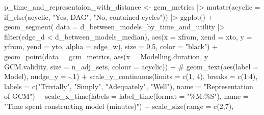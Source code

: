 \documentclass[
  letterpaper,
  DIV=11,
  numbers=noendperiod]{scrartcl}
\newenvironment{Shaded}{\begin{snugshade}}{\end{snugshade}}
\newcommand{\AttributeTok}[1]{\textcolor[rgb]{0.40,0.45,0.13}{#1}}
\newcommand{\CommentTok}[1]{\textcolor[rgb]{0.37,0.37,0.37}{#1}}
\newcommand{\DecValTok}[1]{\textcolor[rgb]{0.68,0.00,0.00}{#1}}
\newcommand{\FloatTok}[1]{\textcolor[rgb]{0.68,0.00,0.00}{#1}}
\newcommand{\FunctionTok}[1]{\textcolor[rgb]{0.28,0.35,0.67}{#1}}
\newcommand{\NormalTok}[1]{\textcolor[rgb]{0.00,0.23,0.31}{#1}}
\newcommand{\OtherTok}[1]{\textcolor[rgb]{0.00,0.23,0.31}{#1}}
\newcommand{\SpecialCharTok}[1]{\textcolor[rgb]{0.37,0.37,0.37}{#1}}
\newcommand{\StringTok}[1]{\textcolor[rgb]{0.13,0.47,0.30}{#1}}
\begin{document}
\begin{Shaded}
\begin{Highlighting}[]
\NormalTok{p\_time\_and\_representaion\_with\_distance }\OtherTok{\textless{}{-}} 
\NormalTok{    gcm\_metrics }\SpecialCharTok{|\textgreater{}} 
    \FunctionTok{mutate}\NormalTok{(}\AttributeTok{acyclic =} \FunctionTok{if\_else}\NormalTok{(acyclic, }\StringTok{"Yes, DAG"}\NormalTok{, }\StringTok{"No, contained cycles"}\NormalTok{)) }\SpecialCharTok{|\textgreater{}} 
    \FunctionTok{ggplot}\NormalTok{() }\SpecialCharTok{+}
    \FunctionTok{geom\_segment}\NormalTok{(}
        \AttributeTok{data =}\NormalTok{ d\_between\_models\_by\_time\_and\_utility }\SpecialCharTok{|\textgreater{}} 
            \FunctionTok{filter}\NormalTok{(edge\_d }\SpecialCharTok{\textless{}}\NormalTok{ d\_between\_models\_median),}
        \FunctionTok{aes}\NormalTok{(}\AttributeTok{x =}\NormalTok{ xfrom, }\AttributeTok{xend =}\NormalTok{ xto, }\AttributeTok{y =}\NormalTok{ yfrom, }\AttributeTok{yend =}\NormalTok{ yto,}
            \AttributeTok{alpha =}\NormalTok{ edge\_w), }\AttributeTok{size =} \FloatTok{0.5}\NormalTok{, }\AttributeTok{color =} \StringTok{"black"}\NormalTok{) }\SpecialCharTok{+}
    \FunctionTok{geom\_point}\NormalTok{(}\AttributeTok{data =}\NormalTok{ gcm\_metrics, }
               \FunctionTok{aes}\NormalTok{(}\AttributeTok{x =}\NormalTok{ Modelling.duration, }\AttributeTok{y =}\NormalTok{ GCM.validity, }\AttributeTok{size =}\NormalTok{ n\_adj\_sets, }\AttributeTok{colour =}\NormalTok{ acyclic)) }\SpecialCharTok{+}
    \CommentTok{\# geom\_text(aes(label = Model), nudge\_y = {-}.1) +}
    \FunctionTok{scale\_y\_continuous}\NormalTok{(}\AttributeTok{limits =} \FunctionTok{c}\NormalTok{(}\DecValTok{1}\NormalTok{, }\DecValTok{4}\NormalTok{),}
                       \AttributeTok{breaks =} \FunctionTok{c}\NormalTok{(}\DecValTok{1}\SpecialCharTok{:}\DecValTok{4}\NormalTok{),}
                       \AttributeTok{labels =} \FunctionTok{c}\NormalTok{(}\StringTok{"Trivially"}\NormalTok{, }\StringTok{"Simply"}\NormalTok{, }\StringTok{"Adequately"}\NormalTok{, }\StringTok{"Well"}\NormalTok{),}
                       \AttributeTok{name =} \StringTok{"Representation of GCM"}\NormalTok{) }\SpecialCharTok{+}
     \FunctionTok{scale\_x\_time}\NormalTok{(}\AttributeTok{labels =} \FunctionTok{label\_time}\NormalTok{(}\AttributeTok{format =} \StringTok{"\%M:\%S"}\NormalTok{),}
                  \AttributeTok{name =} \StringTok{"Time spent constructing model (minutes)"}\NormalTok{) }\SpecialCharTok{+}
    \FunctionTok{scale\_size}\NormalTok{(}\AttributeTok{range =} \FunctionTok{c}\NormalTok{(}\DecValTok{2}\NormalTok{,}\DecValTok{7}\NormalTok{),}

\end{Highlighting}
\end{Shaded}
\end{document}

